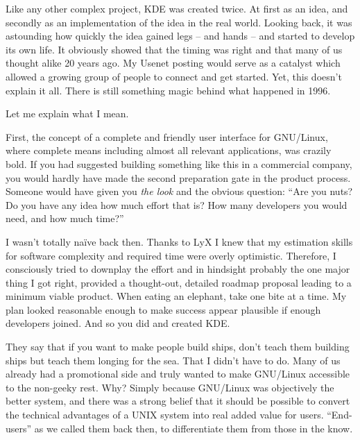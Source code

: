 

\noindent{}Like any other complex project, KDE was created twice. At first as an idea, and secondly as an implementation of the idea in the real world. Looking back, it was astounding how quickly the idea gained legs – and hands – and started to develop its own life. It obviously showed that the timing was right and that many of us thought alike 20 years ago. My Usenet posting would serve as a catalyst which allowed a growing group of people to connect and get started. Yet, this doesn't explain it all. There is still something magic behind what happened in 1996.

Let me explain what I mean.
 
First, the concept of a complete and friendly user interface for GNU/Linux, where complete means including almost all relevant applications, was crazily bold. If you had suggested building something like this in a commercial company, you would hardly have made the second preparation gate in the product process. Someone would have given you \textit{the look} and the obvious question: “Are you nuts? Do you have any idea how much effort that is? How many developers you would need, and how much time?”
 
I wasn't totally naïve back then. Thanks to LyX I knew that my estimation skills for software complexity and required time were overly optimistic. Therefore, I consciously tried to downplay the effort and in hindsight probably the one major thing I got right, provided a thought-out, detailed roadmap proposal leading to a minimum viable product. When eating an elephant, take one bite at a time. My plan looked reasonable enough to make success appear plausible if enough developers joined. And so you did and created KDE.
 
They say that if you want to make people build ships, don't teach them building ships but teach them longing for the sea. That I didn't have to do. Many of us already had a promotional side and truly wanted to make GNU/Linux accessible to the non-geeky rest. Why? Simply because GNU/Linux was objectively the better system, and there was a strong belief that it should be possible to convert the technical advantages of a UNIX system into real added value for users. “End-users” as we called them back then, to differentiate them from those in the know.
 

